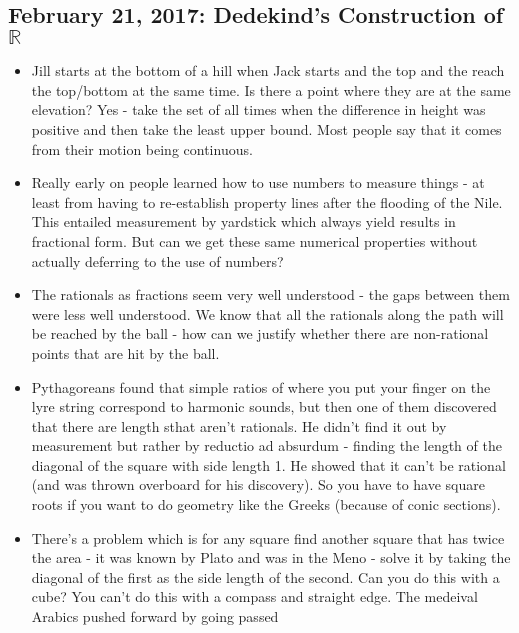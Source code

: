 \documentclass[12pt]{article}
\theoremstyle{definition}
\begin{document}
\subsection{February 21, 2017: Dedekind's Construction of $\mathbb{R}$}

\begin{itemize}
    \itemsep0em 
    \item  
        Jill starts at the bottom of a hill when Jack starts and the top and
        the reach the top/bottom at the same time. Is there a point where they
        are at the same elevation? Yes - take the set of all times when the
        difference in height was positive and then take the least upper bound.
        Most people say that it comes from their motion being continuous.
    \item
        Really early on people learned how to use numbers to measure things -
        at least from having to re-establish property lines after the flooding
        of the Nile. This entailed measurement by yardstick which always yield
        results in fractional form. But can we get these same numerical
        properties without actually deferring to the use of numbers? 
    \item
        The rationals as fractions seem very well understood - the gaps between
        them were less well understood. We know that all the rationals along
        the path will be reached by the ball - how can we justify whether there
        are non-rational points that are hit by the ball.
    \item
        Pythagoreans found that simple ratios of where you put your finger on
        the lyre string correspond to harmonic sounds, but then one of them
        discovered that there are length sthat aren't rationals. He
        didn't find it out by measurement but rather by reductio ad absurdum -
        finding the length of the diagonal of the square with side length 1. He
        showed that it can't be rational (and was thrown overboard for his
        discovery). So you have to have square roots if you want to do geometry
        like the Greeks (because of conic sections).
    \item
        There's a problem which is for any square find another square that has
        twice the area - it was known by Plato and was in the Meno - solve it
        by taking the diagonal of the first as the side length of the second.
        Can you do this with a cube? You can't do this with a compass and
        straight edge. The medeival Arabics pushed forward by going passed

\end{itemize}
\end{document}
